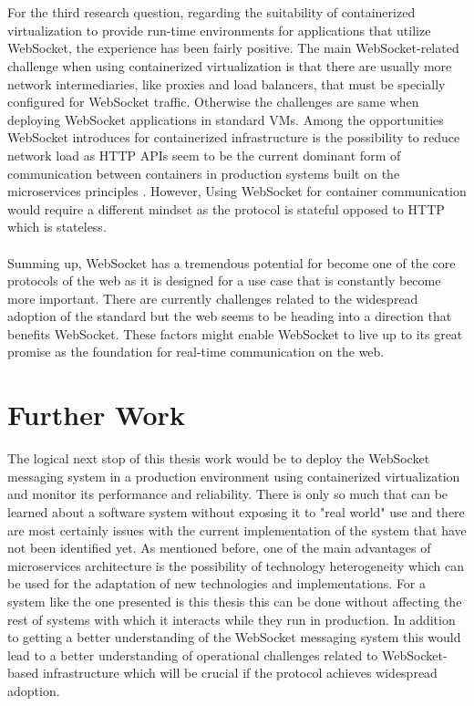 \\ \\
For the third research question, regarding the suitability of containerized virtualization to provide run-time environments for applications that utilize WebSocket, the experience has been fairly positive. The main WebSocket-related challenge when using containerized virtualization is that there are usually more network intermediaries, like proxies and load balancers, that must be specially configured for WebSocket traffic. Otherwise the challenges are same when deploying WebSocket applications in standard VMs. Among the opportunities WebSocket introduces for containerized infrastructure is the possibility to reduce network load as HTTP APIs seem to be the current dominant form of communication between containers in production systems built on the microservices principles \cite{fowlervMicroservices}. However, Using WebSocket for container communication would require a different mindset as the protocol is stateful opposed to HTTP which is stateless.
\\ \\
Summing up, WebSocket has a tremendous potential for become one of the core protocols of the web as it is designed for a use case that is constantly become more important. There are currently challenges related to the widespread adoption of the standard but the web seems to be heading into a direction that benefits WebSocket. These factors might enable WebSocket to live up to its great promise as the foundation for real-time communication on the web.

\section{Further Work}

The logical next stop of this thesis work would be to deploy the WebSocket messaging system in a production environment using containerized virtualization and monitor its performance and reliability. There is only so much that can be learned about a software system without exposing it to "real world" use and there are most certainly issues with the current implementation of the system that have not been identified yet. As mentioned before, one of the main advantages of microservices architecture is the possibility of technology heterogeneity which can be used for the adaptation of new technologies and implementations. For a system like the one presented is this thesis this can be done without affecting the rest of systems with which it interacts while they run in production. In addition to getting a better understanding of the WebSocket messaging system this would lead to a better understanding of operational challenges related to WebSocket-based infrastructure which will be crucial if the protocol achieves widespread adoption. 